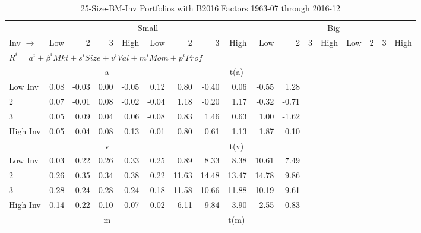 
\begin{table}[!ht]
\centering
\caption{25-Size-BM-Inv Portfolios with B2016 Factors 1963-07 through 2016-12}
\begin{tabular}{lrrrrrrrrrrrrrrrr}
  \toprule
    & \multicolumn{8}{c}{Small} & \multicolumn{8}{c}{Big} \\
      \cmidrule(r){2-9} \cmidrule(r){10-17}
    Inv $\rightarrow$ & Low & 2 & 3 & High & Low & 2 & 3 & High & Low & 2 & 3 & High & Low & 2 & 3 & High \\ 
  \midrule
  \multicolumn{11}{l}{$R^i=a^i+\beta^iMkt+s^iSize+v^iVal+m^iMom+p^iProf$} \\

  
    
      & \multicolumn{5}{c}{a} & \multicolumn{5}{c}{t(a)}
    
    \\
      \cmidrule(r){2-5} \cmidrule(r){6-9} \cmidrule(r){10-13} \cmidrule(r){14-17}

    Low Inv   & 0.08  & -0.03  & 0.00  & -0.05  & 0.12  & 0.80  & -0.40  & 0.06  & -0.55  & 1.28  \\
           2  & 0.07  & -0.01  & 0.08  & -0.02  & -0.04  & 1.18  & -0.20  & 1.17  & -0.32  & -0.71  \\
           3  & 0.05  & 0.09  & 0.04  & 0.06  & -0.08  & 0.83  & 1.46  & 0.63  & 1.00  & -1.62  \\
    High Inv  & 0.05  & 0.04  & 0.08  & 0.13  & 0.01  & 0.80  & 0.61  & 1.13  & 1.87  & 0.10  \\

  
    
      & \multicolumn{5}{c}{v} & \multicolumn{5}{c}{t(v)}
    
    \\
      \cmidrule(r){2-5} \cmidrule(r){6-9} \cmidrule(r){10-13} \cmidrule(r){14-17}

    Low Inv   & 0.03  & 0.22  & 0.26  & 0.33  & 0.25  & 0.89  & 8.33  & 8.38  & 10.61  & 7.49  \\
           2  & 0.26  & 0.35  & 0.34  & 0.38  & 0.22  & 11.63  & 14.48  & 13.47  & 14.78  & 9.86  \\
           3  & 0.28  & 0.24  & 0.28  & 0.24  & 0.18  & 11.58  & 10.66  & 11.88  & 10.19  & 9.61  \\
    High Inv  & 0.14  & 0.22  & 0.10  & 0.07  & -0.02  & 6.11  & 9.84  & 3.90  & 2.55  & -0.83  \\

  
    
      & \multicolumn{5}{c}{m} & \multicolumn{5}{c}{t(m)}
    

\end{tabular}
\end{table}
